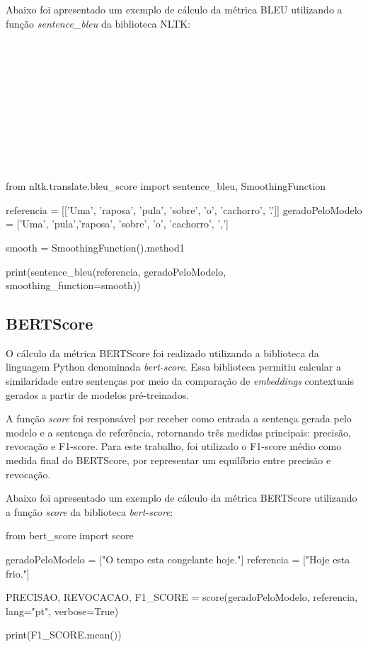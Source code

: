 Abaixo foi apresentado um exemplo de cálculo da métrica BLEU utilizando a função \textit{sentence\_bleu} da biblioteca NLTK:
\\
\\
\\
\\
\\
\\
\\
\\
\\
\\
\\
\begin{listing}
\begin{python}
from nltk.translate.bleu_score import sentence_bleu, SmoothingFunction

referencia = [['Uma', 'raposa', 'pula', 'sobre', 'o', 'cachorro', '.']]
geradoPeloModelo = ['Uma', 'pula','raposa', 'sobre', 'o', 'cachorro', ',']

smooth = SmoothingFunction().method1

print(sentence_bleu(referencia, geradoPeloModelo, smoothing_function=smooth))
\end{python}
\caption{Exemplo de cálculo da métrica BLEU com NLTK}
\label{code:bleu_example}
\end{listing}

\subsection{BERTScore}

O cálculo da métrica BERTScore foi realizado utilizando a biblioteca da linguagem Python denominada \textit{bert-score}. Essa biblioteca permitiu calcular a similaridade entre sentenças por meio da comparação de \textit{embeddings} contextuais gerados a partir de modelos pré-treinados.

A função \textit{score} foi responsável por receber como entrada a sentença gerada pelo modelo e a sentença de referência, retornando três medidas principais: precisão, revocação e F1-score. Para este trabalho, foi utilizado o F1-score médio como medida final do BERTScore, por representar um equilíbrio entre precisão e revocação.

Abaixo foi apresentado um exemplo de cálculo da métrica BERTScore utilizando a função \textit{score} da biblioteca \textit{bert-score}:

\begin{listing}
\begin{python}
from bert_score import score

geradoPeloModelo = ["O tempo esta congelante hoje."]
referencia = ["Hoje esta frio."]

PRECISAO, REVOCACAO, F1_SCORE = score(geradoPeloModelo, referencia, lang="pt", verbose=True)

print(F1_SCORE.mean())

\end{python}
\caption{Exemplo de cálculo da métrica BERTScore com a biblioteca bert-score}
\label{code:bertscore_example}
\end{listing}

